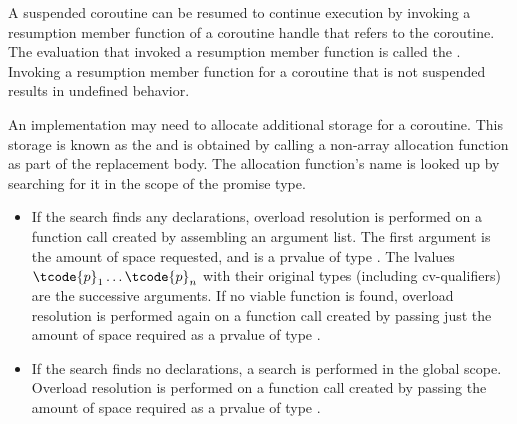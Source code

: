 \pnum
A suspended coroutine can be resumed to continue execution by invoking
a resumption member function
of a coroutine handle
that refers to the coroutine.
The evaluation that invoked a resumption member function is
called the .
Invoking a resumption member function for a coroutine
that is not suspended results in undefined behavior.
%
%
%
%
%

\pnum
An implementation may need to allocate additional storage for a coroutine.
This storage is known as the  and is obtained by calling
a non-array allocation function
as part of the replacement body.
The allocation function's name is looked up by searching for it in the scope of the promise type.
\begin{itemize}
\item
If the search finds any declarations,
overload resolution is performed on a function call created by assembling an
argument list. The first argument is the amount of space requested, and
is a prvalue of type .
The lvalues $\tcode{p}_1 \dotsc \tcode{p}_n$
with their original types (including cv-qualifiers)
are the successive arguments.
If no viable function is found,
overload resolution is performed again
on a function call created by passing just
the amount of space required as a prvalue of type .
\item
If the search finds no declarations, a search is performed in the global scope.
Overload resolution is performed on a function call created by
passing the amount of space required as a prvalue of type .
\end{itemize}

